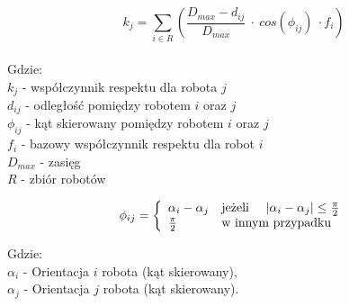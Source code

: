  \begin{equation}
 k_j = \sum_{i \in R}  \left(   \frac{D_{max} - d_{ij}}{D_{max}} ~ \cdot ~ cos(\phi_{ij}) ~ \cdot f_i \right)
 \label{eq:fearFactor}
 \end{equation}
 \\
 Gdzie:
 \\
 $ k_j $ - współczynnik respektu dla robota $ j $
 \\
 $ d_{ij} $ - odległość pomiędzy robotem $ i $ oraz $ j $
 \\
 $ \phi_{ij} $ - kąt skierowany pomiędzy robotem $ i $ oraz $ j $
 \\
 $ f_i $ - bazowy współczynnik respektu dla robot $ i $
 \\
 $ D_{max} $ - zasięg
 \\
 $ R $ - zbiór robotów
 
 
 \begin{equation}
 \phi_{ij} = \left\{\begin{array}{ll}
 \alpha_i - \alpha_j  & \mbox{jeżeli } ~~~ |\alpha_i - \alpha_j| \leq \frac{\pi}{2} \\
 \frac{\pi}{2} & \mbox{w innym przypadku}
 \cr
 \end{array}\right.
 \label{eq:fearFactorAngle}
 \end{equation}
 
 Gdzie:
 \\
 $ \alpha_i $ - Orientacja $ i $ robota (kąt skierowany),
 \\
 $ \alpha_j $ - Orientacja $ j $ robota (kąt skierowany).
 \\